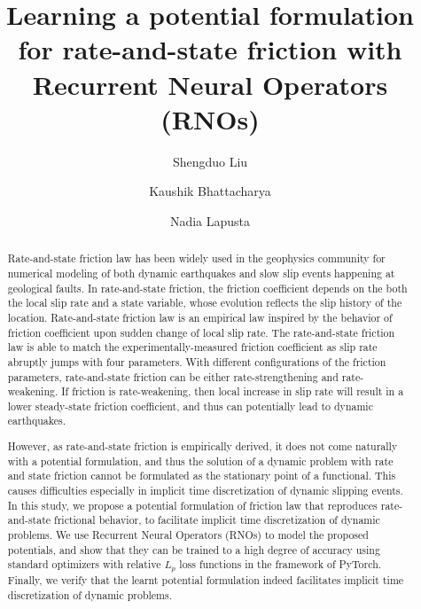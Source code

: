 \documentclass[final,a4paper]{elsarticle}
\begin{document}
\begin{frontmatter}

\title{Learning a potential formulation for rate-and-state friction with Recurrent Neural Operators (RNOs)}
            

\author[1]{Shengduo Liu}
\author[1]{Kaushik Bhattacharya}
\author[1,2]{Nadia Lapusta}

\begin{abstract}
Rate-and-state friction law has been widely used in the geophysics community for numerical modeling of both dynamic earthquakes and slow slip events happening at geological faults. 
In rate-and-state friction, 
the friction coefficient depends on the both the local slip rate and a state variable, 
whose evolution reflects the slip history of the location. 
Rate-and-state friction law is an empirical law inspired by the behavior of friction coefficient upon sudden change of local slip rate. 
The rate-and-state friction law is able to match the experimentally-measured friction coefficient as slip rate abruptly jumps with four parameters. 
With different configurations of the friction parameters, 
rate-and-state friction can be either rate-strengthening and rate-weakening. 
If friction is rate-weakening, 
then local increase in slip rate will result in a lower steady-state friction coefficient, 
and thus can potentially lead to dynamic earthquakes. 

However, 
as rate-and-state friction is empirically derived, 
it does not come naturally with a potential formulation, 
and thus the solution of a dynamic problem with rate and state friction cannot be formulated as the stationary point of a functional. 
This causes difficulties especially in implicit time discretization of dynamic slipping events. 
In this study, 
we propose a potential formulation of friction law that reproduces rate-and-state frictional behavior, 
to facilitate implicit time discretization of dynamic problems. 
We use Recurrent Neural Operators (RNOs) to model the proposed potentials,  
and show that they can be trained to a high degree of accuracy using standard optimizers with relative $L_p$ loss functions in the framework of PyTorch. 
Finally, 
we verify that the learnt potential formulation indeed facilitates implicit time discretization of dynamic problems. 


\end{abstract}
\end{frontmatter}
\end{document}
